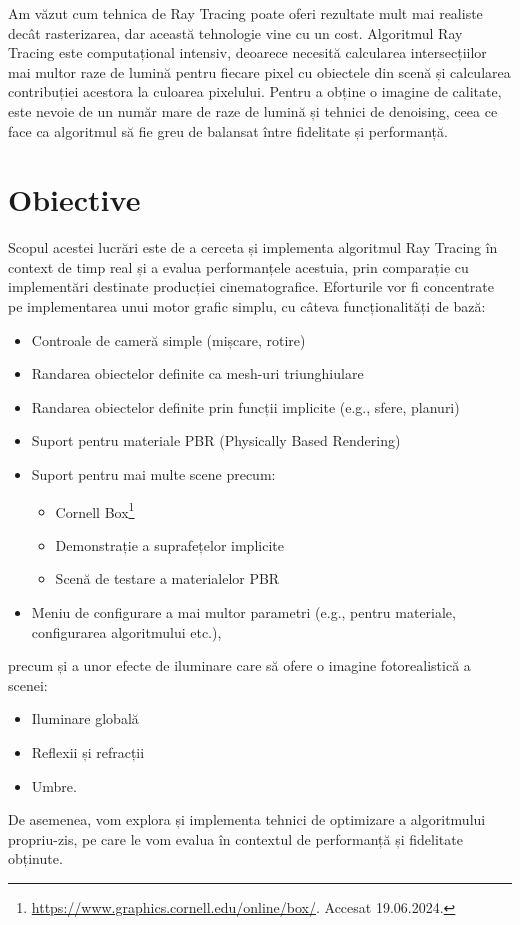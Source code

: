\documentclass[12pt,a4paper]{report}
\numberwithin{equation}{section} %
\begin{document}
Am văzut cum tehnica de Ray Tracing poate oferi rezultate mult mai realiste
decât rasterizarea, dar această tehnologie vine cu un cost.
Algoritmul Ray Tracing este computațional intensiv, deoarece necesită
calcularea intersecțiilor mai multor raze de lumină pentru fiecare pixel cu obiectele din scenă
și calcularea contribuției acestora la culoarea pixelului. Pentru a obține o imagine
de calitate, este nevoie de un număr mare de raze de lumină și tehnici de denoising,
ceea ce face ca algoritmul să fie greu de balansat între fidelitate și performanță.

\section{Obiective}

Scopul acestei lucrări este de a cerceta și implementa algoritmul Ray Tracing în
context de timp real și a evalua performanțele acestuia, prin comparație cu
implementări destinate producției cinematografice. Eforturile vor fi concentrate
pe implementarea unui motor grafic simplu, cu câteva funcționalități de bază:
\begin{itemize}
	\item Controale de cameră simple (mișcare, rotire)
	\item Randarea obiectelor definite ca mesh-uri triunghiulare
	\item Randarea obiectelor definite prin funcții implicite (e.g., sfere, planuri)
	\item Suport pentru materiale PBR (Physically Based Rendering)
	\item Suport pentru mai multe scene precum:
	      \begin{itemize}
		      \item Cornell Box\footnote{\url{https://www.graphics.cornell.edu/online/box/}. Accesat 19.06.2024.}
		      \item Demonstrație a suprafețelor implicite
		      \item Scenă de testare a materialelor PBR
	      \end{itemize}
	\item Meniu de configurare a mai multor parametri (e.g., pentru materiale,
	      configurarea algoritmului etc.),
\end{itemize}
precum și a unor efecte de iluminare care să ofere o imagine fotorealistică a scenei:
\begin{itemize}
	\item Iluminare globală
	\item Reflexii și refracții
	\item Umbre.
\end{itemize}
De asemenea, vom explora și implementa tehnici de optimizare a algoritmului propriu-zis,
pe care le vom evalua în contextul de performanță și fidelitate obținute.
\end{document}

